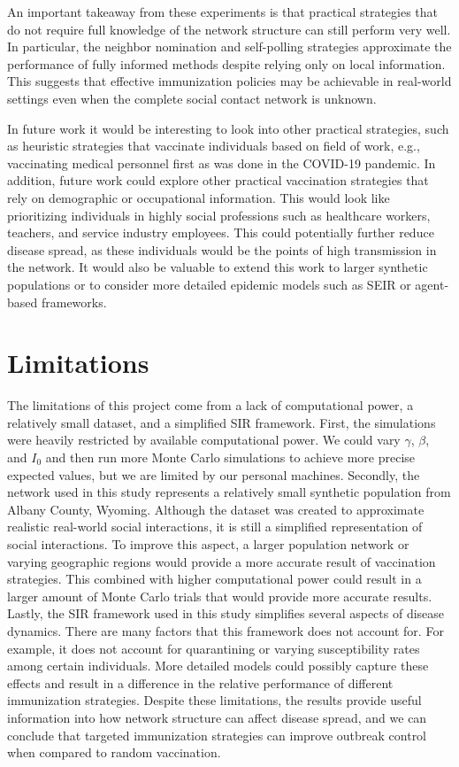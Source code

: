 \documentclass[9pt,twocolumn,twoside]{pnas-new}
\begin{document}
An important takeaway from these experiments is that practical strategies that do not require full knowledge of the network structure can still perform very well. In particular, the neighbor nomination and self-polling strategies approximate the performance of fully informed methods despite relying only on local information. This suggests that effective immunization policies may be achievable in real-world settings even when the complete social contact network is unknown.

In future work it would be interesting to look into other practical strategies, such as heuristic strategies that vaccinate individuals based on field of work, e.g., vaccinating medical personnel first as was done in the COVID-19 pandemic. In addition, future work could explore other practical vaccination strategies that rely on demographic or occupational information. This would look like prioritizing individuals in highly social professions such as healthcare workers, teachers, and service industry employees. This could potentially further reduce disease spread, as these individuals would be the points of high transmission in the network. It would also be valuable to extend this work to larger synthetic populations or to consider more detailed epidemic models such as SEIR or agent-based frameworks.


\section*{Limitations}

The limitations of this project come from a lack of computational power, a relatively small dataset, and a simplified SIR framework. First, the simulations were heavily restricted by available computational power. We could vary $\gamma$, $\beta$, and $I_0$ and then run more Monte Carlo simulations to achieve more precise expected values, but we are limited by our personal machines. Secondly, the network used in this study represents a relatively small synthetic population from Albany County, Wyoming. Although the dataset was created to approximate realistic real-world social interactions, it is still a simplified representation of social interactions. To improve this aspect, a larger population network or varying geographic regions would provide a more accurate result of vaccination strategies. This combined with higher computational power could result in a larger amount of Monte Carlo trials that would provide more accurate results. Lastly, the SIR framework used in this study simplifies several aspects of disease dynamics. There are many factors that this framework does not account for. For example, it does not account for quarantining or varying susceptibility rates among certain individuals. More detailed models could possibly capture these effects and result in a difference in the relative performance of different immunization strategies. Despite these limitations, the results provide useful information into how network structure can affect disease spread, and we can conclude that targeted immunization strategies can improve outbreak control when compared to random vaccination.
\end{document}
